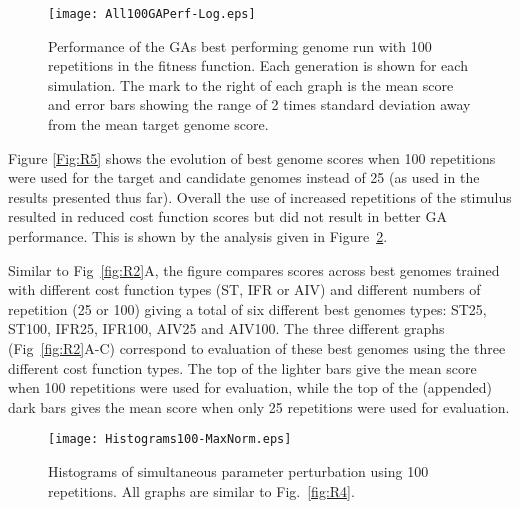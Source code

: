 \begin{figure}[tb!]
  \centering
  \texttt{[image: All100GAPerf-Log.eps]}
  \caption{Performance of the GAs best performing genome run with 100
    repetitions in the fitness function. Each generation is shown for
    each simulation. The mark to the right of each graph is the mean
    score and error bars showing the range of 2 times standard
    deviation away from the mean target genome score.}\label{fig:R5}
\end{figure}

Figure \ref{Fig:R5} shows the evolution of best genome scores when 100
repetitions were used for the target and candidate genomes instead of
25 (as used in the results presented thus far). Overall the use of
increased repetitions of the stimulus resulted in reduced cost
function scores but did not result in better GA performance. This is
shown by the analysis given in Figure~\ref{fig:R6}.

\medskip{}

Similar to Fig~\ref{fig:R2}A, the figure compares scores across best genomes
trained with different cost function types (ST, IFR or AIV) and different
numbers of repetition (25 or 100) giving a total of six different best genomes
types: ST25, ST100, IFR25, IFR100, AIV25 and AIV100. The three different graphs
(Fig~\ref{fig:R2}A-C) correspond to evaluation of these best genomes using the
three different cost function types. The top of the lighter bars give the mean
score when 100 repetitions were used for evaluation, while the top of the
(appended) dark bars gives the mean score when only 25 repetitions were used
for evaluation.

\begin{figure}[tb!]
  \centering
  \texttt{[image: Histograms100-MaxNorm.eps]}  
  \caption{Histograms of simultaneous parameter perturbation using 100
    repetitions. All graphs are similar to Fig.~\ref{fig:R4}.}
  \label{fig:R6}
\end{figure}


